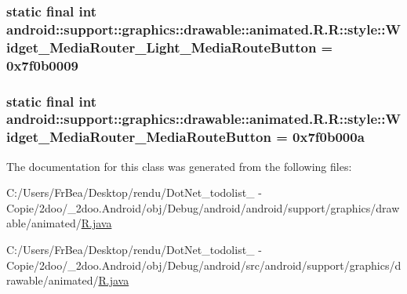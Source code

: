 \hypertarget{classandroid_1_1support_1_1graphics_1_1drawable_1_1animated_1_1_r_1_1style_ea1fd2156f87f87ffe279822fd70553c}{
\subsubsection[{Widget\_\-MediaRouter\_\-Light\_\-MediaRouteButton}]{\setlength{\rightskip}{0pt plus 5cm}static final int android::support::graphics::drawable::animated.R.R::style::Widget\_\-MediaRouter\_\-Light\_\-MediaRouteButton = 0x7f0b0009}}
\label{classandroid_1_1support_1_1graphics_1_1drawable_1_1animated_1_1_r_1_1style_ea1fd2156f87f87ffe279822fd70553c}


\hypertarget{classandroid_1_1support_1_1graphics_1_1drawable_1_1animated_1_1_r_1_1style_6901c7a514c5f235d17a2462973a6dbe}{
\subsubsection[{Widget\_\-MediaRouter\_\-MediaRouteButton}]{\setlength{\rightskip}{0pt plus 5cm}static final int android::support::graphics::drawable::animated.R.R::style::Widget\_\-MediaRouter\_\-MediaRouteButton = 0x7f0b000a}}
\label{classandroid_1_1support_1_1graphics_1_1drawable_1_1animated_1_1_r_1_1style_6901c7a514c5f235d17a2462973a6dbe}




The documentation for this class was generated from the following files:\begin{CompactItemize}
\item 
C:/Users/FrBea/Desktop/rendu/DotNet\_\-todolist\_ - Copie/2doo/\_\-2doo.Android/obj/Debug/android/android/support/graphics/drawable/animated/\hyperlink{android_2support_2graphics_2drawable_2animated_2_r_8java}{R.java}\item 
C:/Users/FrBea/Desktop/rendu/DotNet\_\-todolist\_ - Copie/2doo/\_\-2doo.Android/obj/Debug/android/src/android/support/graphics/drawable/animated/\hyperlink{src_2android_2support_2graphics_2drawable_2animated_2_r_8java}{R.java}\end{CompactItemize}
